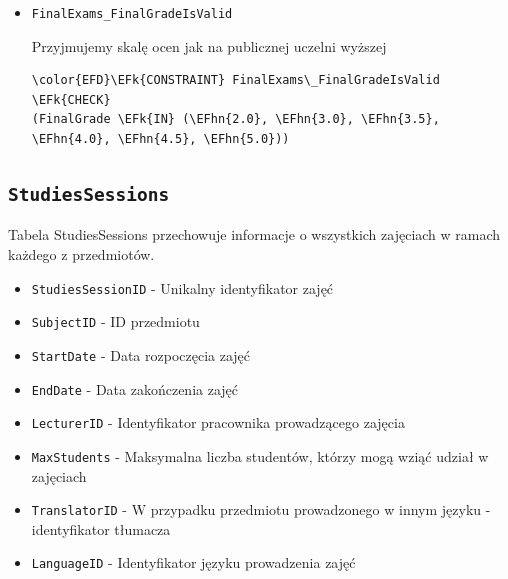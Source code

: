 \documentclass[11pt]{article}
\newcommand{\EFk}[1]{\textcolor{EFk}{\textbf{#1}}} %
\newcommand{\EFhn}[1]{\textcolor{EFhn}{#1}} %
\begin{document}
\begin{itemize}
\item \texttt{FinalExams\_FinalGradeIsValid}

Przyjmujemy skalę ocen jak na publicznej uczelni wyższej
\begin{Code}
\begin{Verbatim}
\color{EFD}\EFk{CONSTRAINT} FinalExams\_FinalGradeIsValid \EFk{CHECK}
(FinalGrade \EFk{IN} (\EFhn{2.0}, \EFhn{3.0}, \EFhn{3.5}, \EFhn{4.0}, \EFhn{4.5}, \EFhn{5.0}))
\end{Verbatim}
\end{Code}
\end{itemize}
\subsection{\texttt{StudiesSessions}}
\label{sec:orgce2e617}
Tabela StudiesSessions przechowuje informacje o wszystkich zajęciach w ramach każdego z przedmiotów.
\begin{itemize}
\item \texttt{StudiesSessionID} - Unikalny identyfikator zajęć
\item \texttt{SubjectID} - ID przedmiotu
\item \texttt{StartDate} - Data rozpoczęcia zajęć
\item \texttt{EndDate} - Data zakończenia zajęć
\item \texttt{LecturerID} - Identyfikator pracownika prowadzącego zajęcia
\item \texttt{MaxStudents} - Maksymalna liczba studentów, którzy mogą wziąć udział w zajęciach
\item \texttt{TranslatorID} - W przypadku przedmiotu prowadzonego w innym języku - identyfikator tłumacza
\item \texttt{LanguageID} - Identyfikator języku prowadzenia zajęć
\end{itemize}
\end{document}

